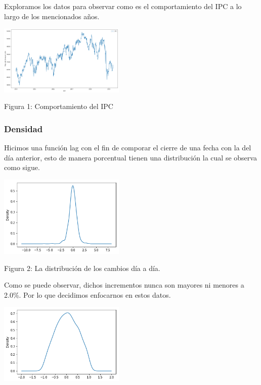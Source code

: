 \documentclass[12pt,reqno,letter]{article}
\newenvironment{fig2}[1][\unskip]{}{} %
\begin{document}
\begin{multicols}{2}
        Exploramos los datos para observar como es el comportamiento del IPC a lo largo de los mencionados años.
        
        \begin{fig2}\includegraphics[width=0.45\textwidth]{img/output_6_0.png}
        \caption{Figura 1: Comportamiento del IPC}
        \end{fig2}
        
        
        \subsubsection{Densidad}
        
        Hicimos una función lag con el fin de comporar el cierre de una fecha con la del día anterior, esto de manera porcentual tienen una distribución la cual se observa como sigue.
        
        \begin{fig2}\includegraphics[width=0.45\textwidth]{img/output_8_1.png}
        \caption{Figura 2: La distribución de los cambios día a día.}\end{fig2}
        
        Como se puede observar, dichos incrementos nunca son mayores ni menores a 2.0\%. Por lo que decidimos enfocarnos en estos datos.
        
        \begin{fig2}\includegraphics[width=0.45\textwidth]{img/output_9_1.png}
        \caption{Figura 3: Distribución de los cambios el intervalo de cambio [-2.0,  2.0]\end{fig2}
        

\end{multicols}
\end{document}

